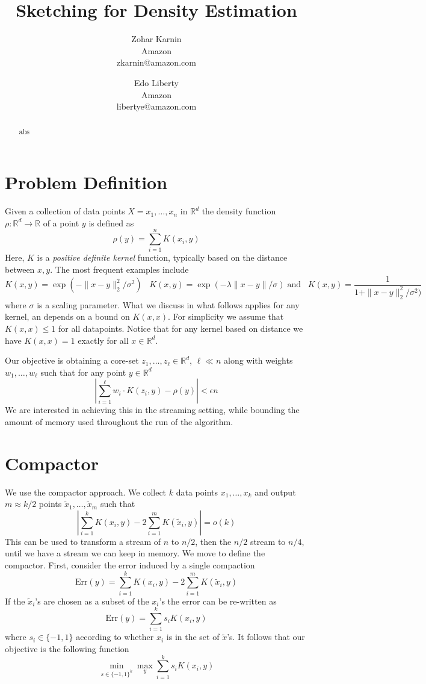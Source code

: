 \documentclass{article} %
\title{Sketching for Density Estimation}
\date{\nonumber}
\author{
Zohar Karnin\\Amazon\\zkarnin@amazon.com
\and
Edo Liberty\\Amazon\\libertye@amazon.com
}
\newcommand{\R}{\mathbb{R}}
\newcommand{\D}{\rho}
\newcommand{\eps}{\epsilon}
\begin{document}
\maketitle

\begin{abstract}
abs\end{abstract}

\section{Problem Definition}
Given a collection of data points $X = x_1,\ldots, x_n$ in $\R^d$ the density function $\rho: \R^d \rightarrow \R$ of a point $y$ is defined as 
$$ \rho(y) = \sum_{i=1}^{n} K(x_i,y) $$
Here, $K$ is a \emph{positive definite kernel} function, typically based on the distance between $x,y$. The most frequent examples include
$$ K(x,y) = \exp(- \|x-y\|_2^2/\sigma^2)\;\;\; K(x,y) = \exp(-\lambda \|x-y\|/\sigma) \; \mbox{and}\;\;\; K(x,y) = \frac{1}{1+\|x-y\|_2^2/\sigma^2)}$$
where $\sigma$ is a scaling parameter. What we discuss in what follows applies for any kernel, an depends on a bound on $K(x,x)$. For simplicity we assume that $K(x,x) \leq 1$ for all datapoints. Notice that for any kernel based on distance we have $K(x,x)=1$ exactly for all $x \in \R^d$.

Our objective is obtaining a core-set $z_1,\ldots, z_\ell \in \R^d$, $\ell \ll n$ along with weights $w_1,\ldots, w_\ell$ such that for any point $y \in \R^d$
$$ \left| \sum_{i=1}^\ell w_i \cdot K(z_i, y) - \D(y) \right| < \eps n $$
We are interested in achieving this in the streaming setting, while bounding the amount of memory used throughout the run of the algorithm.

\section{Compactor}
We use the compactor approach. We collect $k$ data points $x_1,\ldots, x_k$ and output $m \approx k/2$ points $\tilde{x}_1,\ldots, \tilde{x}_m$ such that 
$$ \left| \sum_{i =1}^k K(x_i,y) - 2\sum_{i=1}^m K(\tilde{x}_i, y) \right| = o(k)$$
This can be used to transform a stream of $n$ to $n/2$, then the $n/2$ stream to $n/4$, until we have a stream we can keep in memory. We move to define the compactor. First, consider the error induced by a single compaction
$$ \text{Err}(y) = \sum_{i =1}^k K(x_i,y) - 2\sum_{i=1}^m K(\tilde{x}_i, y) $$
If the $\tilde{x}_i$'s are chosen as a subset of the $x_i$'s the error can be re-written as
$$ \text{Err}(y) = \sum_{i=1}^k s_i K(x_i,y)  $$
where $s_i \in \{-1, 1\}$ according to whether $x_i$ is in the set of $\tilde{x}$'s. It follows that our objective is the following function
$$ \min_{s \in \{-1,1\}^k} \max_y \sum_{i=1}^k s_i K(x_i,y) $$
\end{document}
